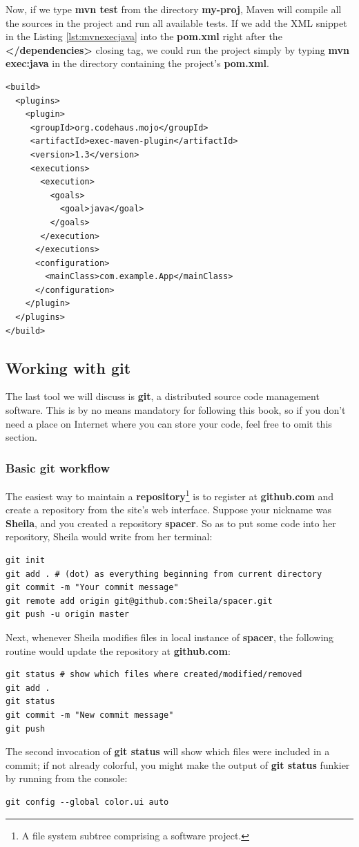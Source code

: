 \documentclass[oneside]{book}
\begin{document}
Now, if we type \textbf{mvn test} from the directory \textbf{my-proj}, Maven will compile all the sources in the project and run all available tests. If we add the XML snippet in the Listing \ref{lst:mvnexecjava} into the \textbf{pom.xml} right after the \textbf{</dependencies>} closing tag, we could run the project simply by typing \textbf{mvn exec:java} in the directory containing the project's \textbf{pom.xml}.
\begin{lstlisting}[caption={Configuring Maven exec plugin},label=lst:mvnexecjava]
<build>
  <plugins>
    <plugin>
     <groupId>org.codehaus.mojo</groupId>
     <artifactId>exec-maven-plugin</artifactId>
     <version>1.3</version>
     <executions>
       <execution>
         <goals>
           <goal>java</goal>
         </goals>
       </execution>
      </executions>
      <configuration>
        <mainClass>com.example.App</mainClass>
      </configuration>
    </plugin>
  </plugins>
</build>
\end{lstlisting}

\subsection{Working with git}
The last tool we will discuss is \textbf{git}, a distributed source code management software. This is by no means mandatory for following this book, so if you don't need a place on Internet where you can store your code, feel free to omit this section.

\subsubsection{Basic git workflow}
The easiest way to maintain a \textbf{repository}\footnote{A file system subtree comprising a software project.} is to register at \textbf{github.com} and create a repository from the site's web interface. Suppose your nickname was \textbf{Sheila}, and you created a repository \textbf{spacer}. So as to put some code into her repository, Sheila would write from her terminal:
\begin{verbatim}
git init
git add . # (dot) as everything beginning from current directory
git commit -m "Your commit message"
git remote add origin git@github.com:Sheila/spacer.git
git push -u origin master
\end{verbatim}
Next, whenever Sheila modifies files in local instance of \textbf{spacer}, the following routine would update the repository at \textbf{github.com}:
\begin{verbatim}
git status # show which files where created/modified/removed
git add . 
git status
git commit -m "New commit message"
git push
\end{verbatim}
The second invocation of \textbf{git status} will show which files were included in a commit; if not already colorful, you might make the output of \textbf{git status} funkier by running from the console:
\begin{verbatim}
git config --global color.ui auto
\end{verbatim}
\end{document}
